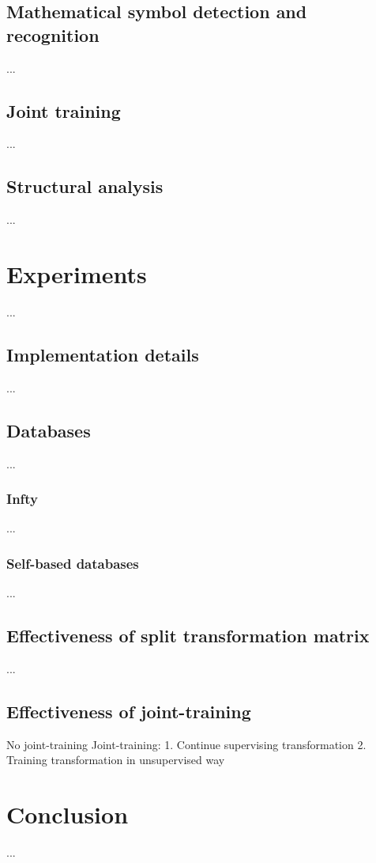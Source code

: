 \documentclass[10pt,conference,a4paper]{IEEEtran}
\begin{document}
	\subsection{Mathematical symbol detection and recognition}	
    ...
	\subsection{Joint training}
	...
	\subsection{Structural analysis}
	...
	\section{Experiments}
	...
	\subsection{Implementation details}
	...
	\subsection{Databases}
	...
	\subsubsection{Infty}
	...
	\subsubsection{Self-based databases}
	...
	\subsection{Effectiveness of split transformation matrix}
	...
	\subsection{Effectiveness of joint-training}
	No joint-training
	Joint-training:
		1. Continue supervising transformation
		2. Training transformation in unsupervised way
	
	
	
	\section{Conclusion}
	...
	
\end{document}
